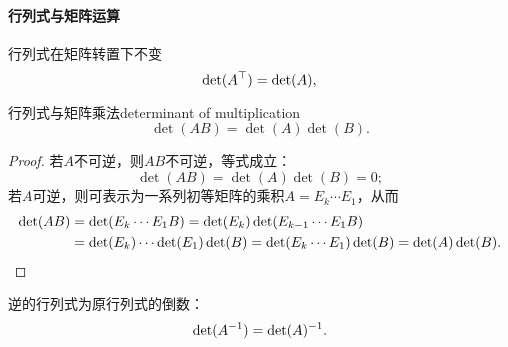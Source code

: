 \paragraph{行列式与矩阵运算}
行列式在矩阵转置下不变
\[
	\det(A^\top)=\det(A),
\]
\begin{theorem}{行列式与矩阵乘法}{determinant of multiplication}
	\begin{equation}
		\det(AB)=\det(A)\det(B).
	\end{equation}
\end{theorem}
\begin{proof}
	若$A$不可逆，则$AB$不可逆，等式成立：
	\[
		\det(AB)=\det(A)\det(B)=0;
	\]
	若$A$可逆，则可表示为一系列初等矩阵的乘积$A=E_k\cdots E_1$，从而
	\begin{align*}
		\det(AB)&=\det(E_k\cdots E_1B)=\det(E_k)\det(E_{k-1}\cdots E_1B)\\
		&=\det(E_k)\cdots\det(E_1)\det(B)=\det(E_k\cdots E_1)\det(B)=\det(A)\det(B).
		\qedhere
	\end{align*}
\end{proof}
\begin{corollary}
	逆的行列式为原行列式的倒数：
	\begin{align}
		\det(A^{-1})=\det(A)^{-1}.
	\end{align}
\end{corollary}

